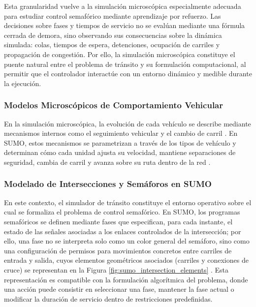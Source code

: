 Esta granularidad vuelve a la simulación microscópica especialmente adecuada para estudiar control semafórico mediante aprendizaje por refuerzo. Las decisiones sobre fases y tiempos de servicio no se evalúan mediante una fórmula cerrada de demora, sino observando sus consecuencias sobre la dinámica simulada: colas, tiempos de espera, detenciones, ocupación de carriles y propagación de congestión. Por ello, la simulación microscópica constituye el puente natural entre el problema de tránsito y su formulación computacional, al permitir que el controlador interactúe con un entorno dinámico y medible durante la ejecución.

\subsubsection{Modelos Microscópicos de Comportamiento Vehicular}

En la simulación microscópica, la evolución de cada vehículo se describe mediante mecanismos internos como el seguimiento vehicular \cite[Cap.~1, Sec.~1.3.2]{fernandez} y el cambio de carril \cite[pp.~352--353]{ite_handbook}. En SUMO, estos mecanismos se parametrizan a través de los tipos de vehículo y determinan cómo cada unidad ajusta su velocidad, mantiene separaciones de seguridad, cambia de carril y avanza sobre su ruta dentro de la red \cite{sumo-doc}.

\subsubsection{Modelado de Intersecciones y Semáforos en SUMO}

En este contexto, el simulador de tránsito constituye el entorno operativo sobre el cual se formaliza el problema de control semafórico. En SUMO, los programas semafóricos se definen mediante fases que especifican, para cada instante, el estado de las señales asociadas a los enlaces controlados de la intersección; por ello, una fase no se interpreta solo como un color general del semáforo, sino como una configuración de permisos para movimientos concretos entre carriles de entrada y salida, cuyos elementos geométricos asociados (carriles y conexiones de cruce) se representan en la Figura \ref{fig:sumo_intersection_elements} \cite{sumo-doc}. Esta representación es compatible con la formulación algorítmica del problema, donde una acción puede consistir en seleccionar una fase, mantener la fase actual o modificar la duración de servicio dentro de restricciones predefinidas.

